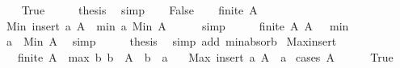 \begin{isabellebody}
\ \ \isamarkupfalse%
\ True\isanewline
\ \ \isamarkupfalse%
\ \isamarkupfalse%
\ {\isacharquery}{\kern0pt}thesis\ \isamarkupfalse%
\ simp\isanewline
{}\isamarkupfalse%
\isanewline
\ \ \isamarkupfalse%
\ False\isanewline
\ \ \isamarkupfalse%
\ {\isacartoucheopen}finite\ A{\isacartoucheclose}\ \isamarkupfalse%
\ {\isachardoublequoteopen}Min\ {\isacharparenleft}{\kern0pt}insert\ a\ A{\isacharparenright}{\kern0pt}\ {\isacharequal}{\kern0pt}\ min\ a\ {\isacharparenleft}{\kern0pt}Min\ A{\isacharparenright}{\kern0pt}{\isachardoublequoteclose}\isanewline
\ \ \ \ \isamarkupfalse%
\ simp\isanewline
\ \ \isamarkupfalse%
\ \isamarkupfalse%
\ {\isacartoucheopen}finite\ A{\isacartoucheclose}\ {\isacartoucheopen}A\ {\isasymnoteq}\ {\isacharbraceleft}{\kern0pt}{\isacharbraceright}{\kern0pt}{\isacartoucheclose}\ min\ \isamarkupfalse%
\ {\isachardoublequoteopen}a\ {\isasymle}\ Min\ A{\isachardoublequoteclose}\ \isamarkupfalse%
\ simp\isanewline
\ \ \isamarkupfalse%
\ \isamarkupfalse%
\ {\isacharquery}{\kern0pt}thesis\ \isamarkupfalse%
\ {\isacharparenleft}{\kern0pt}simp\ add{\isacharcolon}{\kern0pt}\ min{\isachardot}{\kern0pt}absorb{}{\isacharparenright}{\kern0pt}\isanewline
{}\isamarkupfalse%
%
\endisatagproof
{\isafoldproof}%
%
\isadelimproof
\isanewline
%
\endisadelimproof
\isanewline
{}\isamarkupfalse%
\ Max{\isacharunderscore}{\kern0pt}insert{}{\isacharcolon}{\kern0pt}\isanewline
\ \ \ {\isachardoublequoteopen}finite\ A{\isachardoublequoteclose}\ \ max{\isacharcolon}{\kern0pt}\ {\isachardoublequoteopen}{\isasymAnd}b{\isachardot}{\kern0pt}\ b\ {\isasymin}\ A\ {\isasymLongrightarrow}\ b\ {\isasymle}\ a{\isachardoublequoteclose}\isanewline
\ \ \ {\isachardoublequoteopen}Max\ {\isacharparenleft}{\kern0pt}insert\ a\ A{\isacharparenright}{\kern0pt}\ {\isacharequal}{\kern0pt}\ a{\isachardoublequoteclose}\isanewline
%
\isadelimproof
%
\endisadelimproof
%
\isatagproof
{}\isamarkupfalse%
\ {\isacharparenleft}{\kern0pt}cases\ {\isachardoublequoteopen}A\ {\isacharequal}{\kern0pt}\ {\isacharbraceleft}{\kern0pt}{\isacharbraceright}{\kern0pt}{\isachardoublequoteclose}{\isacharparenright}{\kern0pt}\isanewline
\ \ \isamarkupfalse%
\ True\isanewline
\ \ \isamarkupfalse%

\end{isabellebody}
